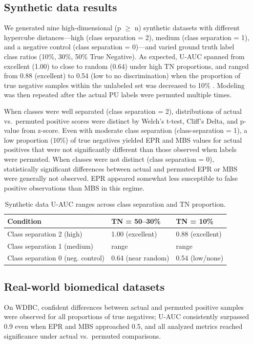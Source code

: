 \documentclass[11pt]{article}
\begin{document}
\subsection{Synthetic data results}
We generated nine high-dimensional (p $\geq$ n) synthetic datasets with different hypercube distances---high (class separation = 2), medium (class separation = 1), and a negative control (class separation = 0)---and varied ground truth label class ratios (10\%, 30\%, 50\% True Negative). As expected, U-AUC spanned from excellent (1.00) to close to random (0.64) under high TN proportions, and ranged from 0.88 (excellent) to 0.54 (low to no discrimination) when the proportion of true negative samples within the unlabeled set was decreased to 10\% \cite{hosmer2013applied}. Modeling was then repeated after the actual PU labels were permuted multiple times.

When classes were well separated (class separation = 2), distributions of actual vs.\ permuted positive scores were distinct by Welch's t-test, Cliff's Delta, and p-value from z-score. Even with moderate class separation (class-separation = 1), a low proportion (10\%) of true negatives yielded EPR and MBS values for actual positives that were not significantly different than those observed when labels were permuted. When classes were not distinct (class separation = 0), statistically significant differences between actual and permuted EPR or MBS were generally not observed. EPR appeared somewhat less susceptible to false positive observations than MBS in this regime.

\begin{table}[h]
\centering
\caption{Synthetic data U-AUC ranges across class separation and TN proportion.}
\begin{tabular}{lll}
\toprule
Condition & TN = 50--30\% & TN = 10\% \\
\midrule
Class separation 2 (high) & 1.00 (excellent) & 0.88 (excellent) \\
Class separation 1 (medium) & range & range \\
Class separation 0 (neg. control) & 0.64 (near random) & 0.54 (low/none) \\
\bottomrule
\end{tabular}
\end{table}

\subsection{Real-world biomedical datasets}
On WDBC, confident differences between actual and permuted positive samples were observed for all proportions of true negatives; U-AUC consistently surpassed 0.9 even when EPR and MBS approached 0.5, and all analyzed metrics reached significance under actual vs.\ permuted comparisons.
\end{document}
